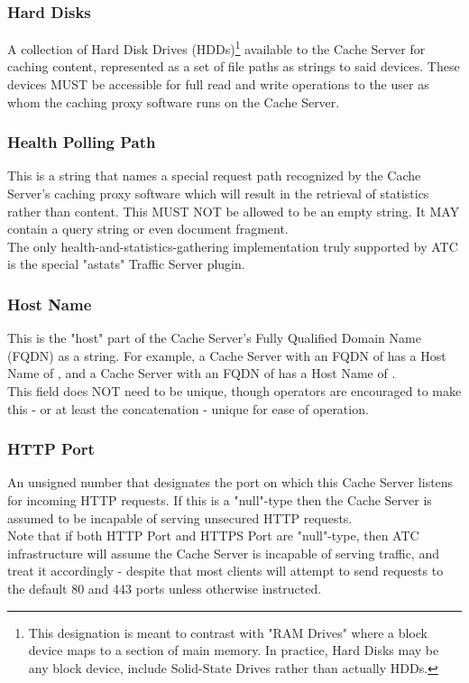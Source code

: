 \subsubsection{Hard Disks}
A collection of Hard Disk Drives (HDDs)\footnote{This designation is meant to
contrast with "RAM Drives" where a block device maps to a section of main memory.
In practice, Hard Disks may be any block device, include Solid-State Drives
rather than actually HDDs.} available to the Cache Server for caching
content, represented as a set of file paths as strings to said devices. These
devices MUST be accessible for full read and write operations to the user as whom
the caching proxy software runs on the Cache Server.

\subsubsection{Health Polling Path}
This is a string that names a special request path recognized by the Cache
Server's caching proxy software which will result in the retrieval of statistics
rather than content. This MUST NOT be allowed to be an empty string. It MAY
contain a query string or even document fragment.\\
The only health-and-statistics-gathering implementation truly supported by ATC is
the special "astats" Traffic Server plugin.

\subsubsection{Host Name}
This is the "host" part of the Cache Server's Fully Qualified Domain Name (FQDN)
as a string. For example, a Cache Server with an FQDN of  has a
Host Name of , and a Cache Server with an FQDN of
 has a Host Name of .\\
This field does NOT need to be unique, though operators are encouraged to make
this - or at least the concatenation  - unique
for ease of operation.

\subsubsection{HTTP Port}
An unsigned number that designates the port on which this Cache Server listens
for incoming HTTP requests. If this is a "null"-type then the Cache Server is
assumed to be incapable of serving unsecured HTTP requests.\\
Note that if both HTTP Port and HTTPS Port are "null"-type, then ATC
infrastructure will assume the Cache Server is incapable of serving traffic, and
treat it accordingly - despite that most clients will attempt to send requests to
the default 80 and 443 ports unless otherwise instructed.

